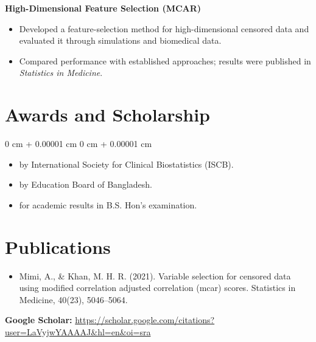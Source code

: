 \documentclass[10pt, letterpaper]{article}
\newenvironment{highlights}{
    \begin{itemize}[
        topsep=0.10 cm,
        parsep=0.10 cm,
        partopsep=0pt,
        itemsep=0pt,
        leftmargin=0 cm + 10pt
    ]
}{
    \end{itemize}
} %
\newenvironment{onecolentry}{
    \begin{adjustwidth}{
        0 cm + 0.00001 cm
    }{
        0 cm + 0.00001 cm
    }
}{
    \end{adjustwidth}
} %
\begin{document}
    \textbf{High-Dimensional Feature Selection (MCAR)} \\
    \begin{itemize}
    \item Developed a feature-selection method for high-dimensional censored data and evaluated it through simulations and biomedical data.
    \item Compared performance with established approaches; results were published in \textit{Statistics in Medicine}.
\end{itemize}

     \vspace{0.2 cm}
    \section{Awards and Scholarship}
        \vspace{0.10 cm}
        \begin{onecolentry}
            \begin{highlights}
                \item {} by International Society for Clinical Biostatistics (ISCB). %
                \item {} by Education Board of Bangladesh. %
                \item {} for academic results in B.S. Hon’s examination.
            \end{highlights}
        \end{onecolentry}


    \section{Publications}
        
        \begin{samepage}
        \begin{itemize}
            \item Mimi, A., \& Khan, M. H. R. (2021). Variable selection for censored data using modified correlation adjusted correlation (mcar) scores. Statistics in Medicine, 40(23), 5046–5064.     
           

        \end{itemize}
        \textbf{Google Scholar:} \href{https://scholar.google.com/citations?user=LaVyjwYAAAAJ&hl=en&oi=sra}{https://scholar.google.com/citations?user=LaVyjwYAAAAJ\&hl=en\&oi=sra}
         \end{samepage}
\end{document}
